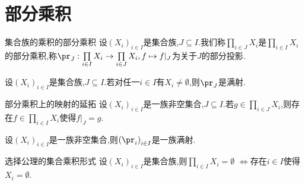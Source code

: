 \section{部分乘积}

\begin{definition}{集合族的乘积的部分乘积}{}
	设$\left(X_{i}\right)_{i\in I}$是集合族,$J\subseteq I$.我们称$\prod\limits_{i\in J}X_{i}$是$\prod\limits_{i\in I}X_{i}$的部分乘积,称$\pr_{J}:\prod\limits_{i\in I}X_{i}\to\prod\limits_{i\in J}X_{i},f\mapsto f|_{J}$为关于$J$的部分投影.
\end{definition}

\begin{proposition}{}{}
	设$\left(X_{i}\right)_{i\in I}$是集合族,$J\subseteq I$.若对任一$i\in I$有$X_{i}\neq\emptyset$,则$\pr_{J}$是满射.
\end{proposition}

\begin{proposition}{部分乘积上的映射的延拓}{}
	设$\left(X_{i}\right)_{i\in I}$是一族非空集合,$J\subseteq I$.若$g\in\prod\limits_{i\in J}X_{i}$,则存在$f\in\prod\limits_{i\in I}X_{i}$使得$f|_{J}=g$.
\end{proposition}

\begin{corollary}{}{}
	设$\left(X_{i}\right)_{i\in I}$是一族非空集合,则$\left(\pr_{i}\right)_{i\in I}$是一族满射.
\end{corollary}

\begin{corollary}{选择公理的集合乘积形式}{}
	设$\left(X_{i}\right)_{i\in I}$是集合族,则$\prod\limits_{i\in I}X_{i}=\emptyset$ $\iff$存在$i\in I$使得$X_{i}=\emptyset$.
\end{corollary}

